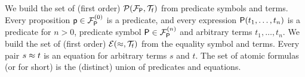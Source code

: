 
\begin{definition}\label{def:predicates}\label{def:equations}\label{def:atoms}
	We build the set of (first order)  $\mcPT$
	from predicate symbols and terms.
	Every proposition $\mpp\in \mcFPn[0]$ is a predicate,
	and every expression $\mP(t_1,\ldots,t_n)$ is a predicate for $n>0$,
	predicate symbol $\mP\in\mcFPn$ and arbitrary terms $t_1,\ldots,t_n$.
%
	We build the set of (first order) $\mcET$ from the equality symbol and terms.
	Every pair $s\mEQ t$ is an equation %
	for arbitrary terms $s$ and $t$.
%
	The set of atomic formulas (or  for short) is the (distinct) union of predicates and equations.
\end{definition}
